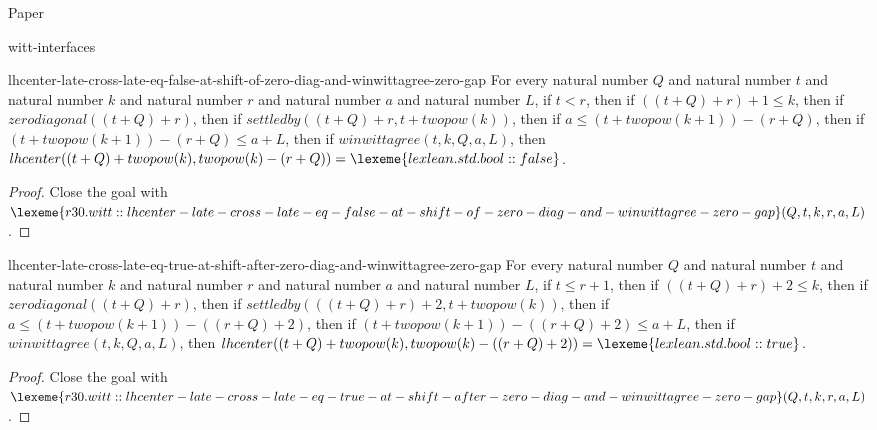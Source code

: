 \begin{lexlean}{Paper}
\begin{section}{witt-interfaces}
  \begin{theorem}{lhcenter-late-cross-late-eq-false-at-shift-of-zero-diag-and-winwittagree-zero-gap}
  For every natural number \(Q\) and natural number \(t\) and natural number \(k\) and natural number \(r\) and natural number \(a\) and natural number \(L\), if \(t < r\), then if \(((t + Q) + r) + 1 ≤ k\), then if \(zerodiagonal((t + Q) + r)\), then if \(settledby((t + Q) + r, t + twopow(k))\), then if \(a ≤ (t + twopow(k + 1)) - (r + Q)\), then if \((t + twopow(k + 1)) - (r + Q) ≤ a + L\), then if \(winwittagree(t, k, Q, a, L)\), then \(lhcenter((t + Q) + twopow(k), twopow(k) - (r + Q)) = \lexeme{lexlean.std.bool::false}\).
  \begin{proof}
  Close the goal with \(\lexeme{r30.witt::lhcenter-late-cross-late-eq-false-at-shift-of-zero-diag-and-winwittagree-zero-gap}(Q, t, k, r, a, L)\).
  \end{proof}
  \end{theorem}

  \begin{theorem}{lhcenter-late-cross-late-eq-true-at-shift-after-zero-diag-and-winwittagree-zero-gap}
  For every natural number \(Q\) and natural number \(t\) and natural number \(k\) and natural number \(r\) and natural number \(a\) and natural number \(L\), if \(t ≤ r + 1\), then if \(((t + Q) + r) + 2 ≤ k\), then if \(zerodiagonal((t + Q) + r)\), then if \(settledby(((t + Q) + r) + 2, t + twopow(k))\), then if \(a ≤ (t + twopow(k + 1)) - ((r + Q) + 2)\), then if \((t + twopow(k + 1)) - ((r + Q) + 2) ≤ a + L\), then if \(winwittagree(t, k, Q, a, L)\), then \(lhcenter((t + Q) + twopow(k), twopow(k) - ((r + Q) + 2)) = \lexeme{lexlean.std.bool::true}\).
  \begin{proof}
  Close the goal with \(\lexeme{r30.witt::lhcenter-late-cross-late-eq-true-at-shift-after-zero-diag-and-winwittagree-zero-gap}(Q, t, k, r, a, L)\).
  \end{proof}
  \end{theorem}


\end{section}
\end{lexlean}
